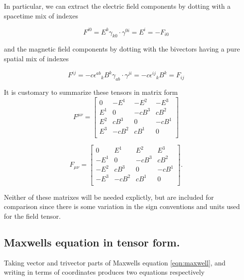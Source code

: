 \documentclass{article}
\begin{document}
In particular, we can extract the electric field components by dotting with a spacetime mix of indexes

\begin{equation*}
F^{i0} = E^k \gamma_{k0} \cdot \gamma^{0i} = E^i = -F_{i0}
\end{equation*}

and the magnetic field components by dotting with the bivectors having a pure spatial mix of indexes

\begin{equation*}
F^{ij} = - c {\epsilon^{a b}}_k B^k \gamma_{a b} \cdot \gamma^{ji} = - c {\epsilon^{i j}}_k B^k = F_{ij}
\end{equation*}

It is customary to summarize these tensors in matrix form
\begin{equation}\label{eqn:matrixtensor}
F^{\mu\nu} =
\begin{bmatrix}
0   & -E^1 & -E^2 & -E^3 \\
E^1 &   0  & -c B^3 &  c B^2 \\
E^2 &  c B^3 &   0  & -c B^1 \\
E^3 & -c B^2 &  c B^1 &   0  \\
\end{bmatrix}
\end{equation}

\begin{equation}
F_{\mu\nu} =
\begin{bmatrix}
0   & E^1 & E^2 & E^3 \\
-E^1 &   0  & -c B^3 &  c B^2 \\
-E^2 &  c B^3 &   0  & -c B^1 \\
-E^3 & -c B^2 &  c B^1 &   0  \\
\end{bmatrix}.
\end{equation}

Neither of these matrixes will be needed explictly, but are included for comparison since there is some variation in the sign conventions and units used
for the field tensor.

\subsection{ Maxwells equation in tensor form. } 

Taking vector and trivector parts of Maxwells equation \ref{eqn:maxwell}, and writing in terms of coordinates produces two equations respectively
\end{document}
